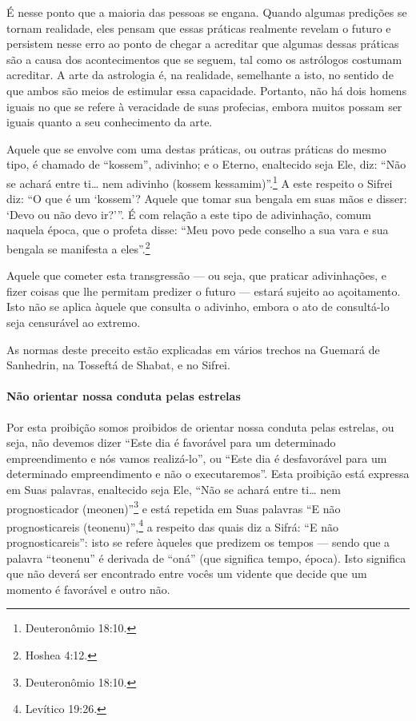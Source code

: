 É nesse ponto que a maioria das pessoas se engana. Quando algumas
predições se tornam realidade, eles pensam que essas práticas realmente
revelam o futuro e persistem nesse erro ao ponto de chegar a acreditar
que algumas dessas práticas são a causa dos acontecimentos que se
seguem, tal como os astrólogos costumam acreditar. A arte da astrologia
é, na realidade, semelhante a isto, no sentido de que ambos são meios de
estimular essa capacidade. Portanto, não há dois homens iguais no que se refere à veracidade de suas
profecias, embora muitos possam ser iguais quanto a seu conhecimento da
arte.

Aquele que se envolve com uma destas práticas, ou outras práticas do
mesmo tipo, é chamado de ``kossem'', adivinho; e o Eterno, enaltecido
seja Ele, diz: ``Não se achará entre ti\ldots{} nem adivinho (kossem
kessamim)''.\footnote{Deuteronômio 18:10.} A este respeito o Sifrei diz: ``O que
é um `kossem'? Aquele que tomar sua bengala em suas mãos e disser: `Devo
ou não devo ir?'''. É com relação a este tipo de adivinhação, comum
naquela época, que o profeta disse: ``Meu povo pede conselho a sua vara
e sua bengala se manifesta a eles''.\footnote{Hoshea 4:12.}

Aquele que cometer esta transgressão --- ou seja, que praticar
adivinhações, e fizer coisas que lhe permitam predizer o futuro ---
estará sujeito ao açoitamento. Isto não se aplica àquele que consulta o
adivinho, embora o ato de consultá-lo seja censurável ao extremo.

As normas deste preceito estão explicadas em vários trechos na Guemará
de Sanhedrin, na Tosseftá de Shabat, e no Sifrei.

\paragraph{Não orientar nossa conduta pelas estrelas}

Por esta proibição somos proibidos de orientar nossa conduta pelas
estrelas, ou seja, não devemos dizer ``Este dia é favorável para um
determinado empreendimento e nós vamos realizá-lo'', ou ``Este dia é
desfavorável para um determinado empreendimento e não o executaremos''.
Esta proibição está expressa em Suas palavras, enaltecido seja Ele,
``Não se achará entre ti\ldots{} nem prognosticador (meonen)''\footnote{Deuteronômio
18:10.} e está repetida em Suas palavras ``E não prognosticareis
(teonenu)'',\footnote{Levítico 19:26.} a respeito das quais diz a Sifrá: ``E não
prognosticareis'': isto se refere àqueles que predizem os tempos ---
sendo que a palavra ``teonenu'' é derivada de ``oná'' (que significa
tempo, época). Isto significa que não deverá ser encontrado entre vocês
um vidente que decide que um momento é favorável e outro não.

